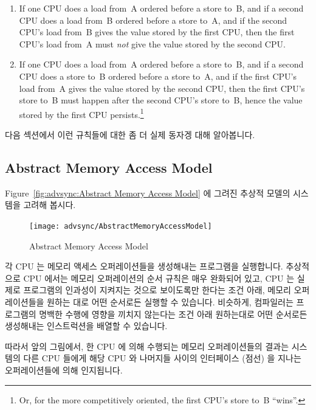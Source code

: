 \begin{enumerate}
\item	If one CPU does a load from~A ordered before a store to~B,
	and if a second CPU does a load from~B ordered before a store to~A,
	and if the second CPU's load from~B gives the value stored by
	the first CPU, then the first CPU's load from~A must \emph{not}
	give the value stored by the second CPU.
\item	If one CPU does a load from~A ordered before a store to~B,
	and if a second CPU does a store to~B ordered before a
	store to~A, and if the first CPU's load from~A gives
	the value stored by the second CPU, then the first CPU's
	store to~B must happen after the second CPU's store to~B,
	hence the value stored by the first CPU persists.\footnote{
		Or, for the more competitively oriented, the first
		CPU's store to~B ``wins''.}
\fi
\end{enumerate}

다음 섹션에서 이런 규칙들에 대한 좀 더 실제 동자겡 대해 알아봅니다.

\subsection{Abstract Memory Access Model}

Figure~\ref{fig:advsync:Abstract Memory Access Model} 에 그려진 추상적 모델의
시스템을 고려해 봅시다.

\begin{figure}[htb]
\centering
\texttt{[image: advsync/AbstractMemoryAccessModel]}
\caption{Abstract Memory Access Model}
\end{figure}

각 CPU 는 메모리 액세스 오퍼레이션들을 생성해내는 프로그램을 실행합니다.
추상적으로 CPU 에서는 메모리 오퍼레이션의 순서 규칙은 매우 완화되어 있고, CPU
는 실제로 프로그램의 인과성이 지켜지는 것으로 보이도록만 한다는 조건 아래,
메모리 오퍼레이션들을 원하는 대로 어떤 순서로든 실행할 수 있습니다.
비슷하게, 컴파일러는 프로그램의 명백한 수행에 영향을 끼치지 않는다는 조건 아래
원하는대로 어떤 순서로든 생성해내는 인스트럭션을 배열할 수 있습니다.

따라서 앞의 그림에서, 한 CPU 에 의해 수행되는 메모리 오퍼레이션들의 결과는
시스템의 다른 CPU 들에게 해당 CPU 와 나머지들 사이의 인터페이스 (점선) 을
지나는 오퍼레이션들에 의해 인지됩니다.


